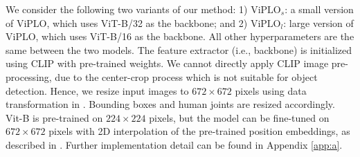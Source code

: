\documentclass[10pt,twocolumn,letterpaper]{article}
\begin{document}
We consider the following two variants of our method: 1) $\textrm{ViPLO}_{s}$: a small version of ViPLO, which uses ViT-B/32 as the backbone; and 2) $\textrm{ViPLO}_{l}$: large version of ViPLO, which uses ViT-B/16 as the backbone. All other hyperparameters are the same between the two models. The feature extractor (i.e., backbone) is initialized using CLIP \cite{radford2021learning} with pre-trained weights. We cannot directly apply CLIP image pre-processing, due to the center-crop process which is not suitable for object detection. Hence, we resize input images to $672 \times 672$ pixels using data transformation in \cite{huang2020devil}. Bounding boxes and human joints are resized accordingly. Vit-B is pre-trained on $224 \times 224$ pixels, but the model can be fine-tuned on $672 \times 672$ pixels with 2D interpolation of the pre-trained position embeddings, as described in \cite{dosovitskiy2020image}. Further implementation detail can be found in Appendix \ref{app:a}.


\begin{table}[t]
\begin{center}
\end{center}
\vspace{-0.2in}
\caption{Performance comparison in terms of mAP on the HICO-DET dataset with ground truth detection results. The best result is marked in bold and the second best result is underlined.}
\label{tab:hicodet-res-gt}
\end{table}
\end{document}
